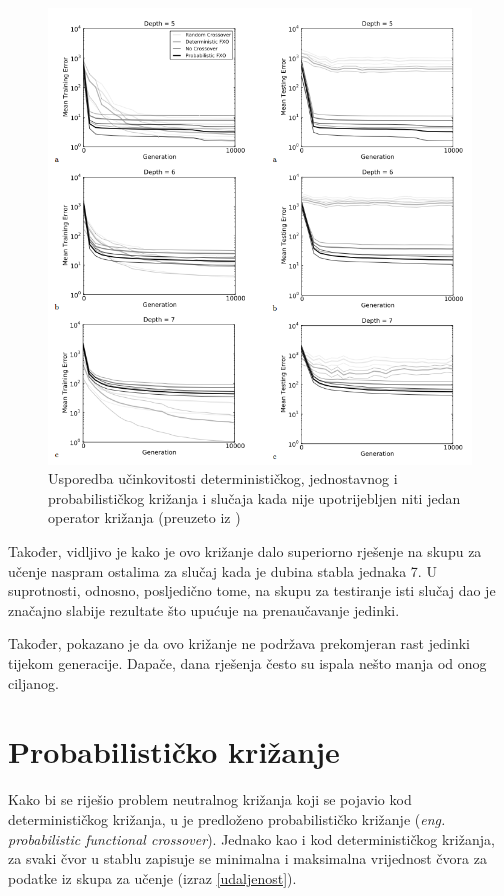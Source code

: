 \begin{figure}[H]
	\centering
	\includegraphics[scale=0.65]{./slike/deto.png}
	\caption{Usporedba učinkovitosti determinističkog, jednostavnog i probabilističkog križanja i slučaja kada nije upotrijebljen niti jedan operator križanja (preuzeto iz \cite{crxDeter})}
	\label{deto}
\end{figure}

Također, vidljivo je kako je ovo križanje dalo superiorno rješenje na skupu za učenje naspram ostalima za slučaj kada je dubina stabla jednaka 7. U suprotnosti, odnosno, posljedično tome, na skupu za testiranje isti slučaj dao je značajno slabije rezultate što upućuje na prenaučavanje jedinki.

Također, pokazano je da ovo križanje ne podržava prekomjeran rast jedinki tijekom generacije. Dapače, dana rješenja često su ispala nešto manja od onog ciljanog.




\section{Probabilističko križanje}

Kako bi se riješio problem neutralnog križanja koji se pojavio kod determinističkog križanja, u \cite{crxDeter} je predloženo probabilističko križanje (\textit{eng. probabilistic functional crossover}). Jednako kao i kod determinističkog križanja, za svaki čvor u stablu zapisuje se minimalna i maksimalna vrijednost čvora za podatke iz skupa za učenje (izraz \ref{udaljenost}).

